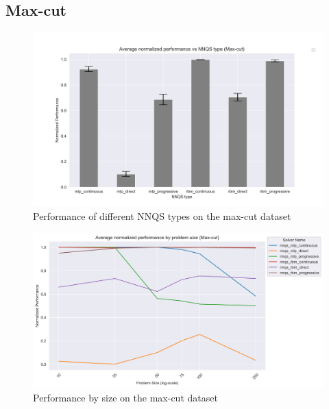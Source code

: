 \subsection{Max-cut}
\begin{figure}[!h]
    \centering
    \includegraphics[width=1\linewidth]{images/maxcut_nnqs_avg.png}
    \caption{Performance of different NNQS types on the max-cut dataset}
    \label{nnqs-maxcut-average}
\end{figure}

\begin{figure}[!h]
    \centering
    \includegraphics[width=1\linewidth]{images/maxcut_nnqs_size.png}
    \caption{Performance by size on the max-cut dataset}
    \label{nnqs-maxcut-size}
\end{figure}

